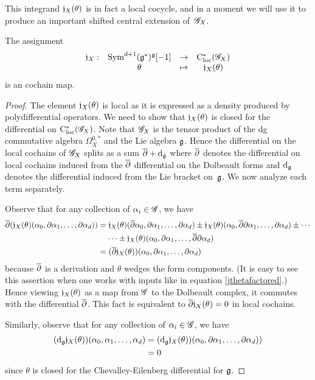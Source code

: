 This integrand $\mathfrak j_X(\theta)$ is in fact a local cocycle, and 
in a moment we will use it to produce an important shifted central extension of~$\mathscr G_X$.

\begin{prop}\label{prop j map} 
The assignment 
\[
\begin{array}{cccc}
\mathfrak j_X : & {\rm Sym}^{d+1} (\mathfrak g^*)^\mathfrak g [-1]  & \to & {\rm C}_{\rm loc}^*(\mathscr G_X) \\ 
& \theta &\mapsto & \mathfrak j_X(\theta)
\end{array}
\]
is an cochain map.
\end{prop}

\begin{proof} 
The element $\mathfrak j_X(\theta)$ is local as it is expressed as a density produced by polydifferential operators.
We need to show that $\mathfrak j_X(\theta)$ is closed for the differential on ${\rm C}_{\rm loc}^*(\mathscr G_X)$. 
Note that $\mathscr G_X$ is the tensor product of the dg commutative algebra $\Omega^{0,*}_X$ and the Lie algebra $\mathfrak g$.
Hence the differential on the local cochains of $\mathscr G_X$ splits as a sum $\overline{\partial} + {\rm d}_{\mathfrak g}$ where $\overline{\partial}$ denotes the differential on local cochains induced from the $\overline{\partial}$ differential on the Dolbeault forms and ${\rm d}_{\mathfrak g}$ denotes the differential induced from the Lie bracket on~$\mathfrak g$. 
We now analyze each term separately.

Observe that for any collection of $\alpha_i \in \mathscr G$, we have
\begin{align*}
\overline{\partial}(\mathfrak j_X(\theta)(\alpha_0,\partial \alpha_1,\ldots,\partial \alpha_d)) 
&= \mathfrak j_X(\theta)(\overline{\partial}\alpha_0,\partial \alpha_1,\ldots,\partial \alpha_d) \pm \mathfrak j_X(\theta)(\alpha_0,\overline{\partial} \partial \alpha_1,\ldots,\partial \alpha_d) \pm \cdots \\ & \;\;\;\; \cdots \pm \mathfrak j_X(\theta)(\alpha_0,\partial \alpha_1,\ldots,\overline{\partial}\partial \alpha_d)\\
&= (\overline{\partial} \mathfrak j_X(\theta))(\alpha_0,\partial \alpha_1,\ldots,\partial \alpha_d)
\end{align*}
because $\overline{\partial}$ is a derivation and $\theta$ wedges the form components.
(It is easy to see this assertion when one works with inputs like in equation \eqref{jthetafactored}.)
Hence viewing $\mathfrak j_X(\theta)$ as a map from $\mathscr G$ to the Dolbeault complex, 
it commutes with the differential $\overline{\partial}$.
This fact is equivalent to $\overline{\partial} \mathfrak j_X(\theta) = 0$ in local cochains.

Similarly, observe that for any collection of $\alpha_i \in \mathscr G$, we have
\begin{align*}
({\rm d}_\mathfrak g \mathfrak j_X(\theta))(\alpha_0, \alpha_1,\ldots, \alpha_d)
&= ({\rm d}_\mathfrak g\mathfrak j_X(\theta))(\alpha_0,\partial \alpha_1,\ldots,\partial \alpha_d)) \\
&= 0
\end{align*}
since $\theta$ is closed for the Chevalley-Eilenberg differential for $\mathfrak g$. 
\end{proof}

